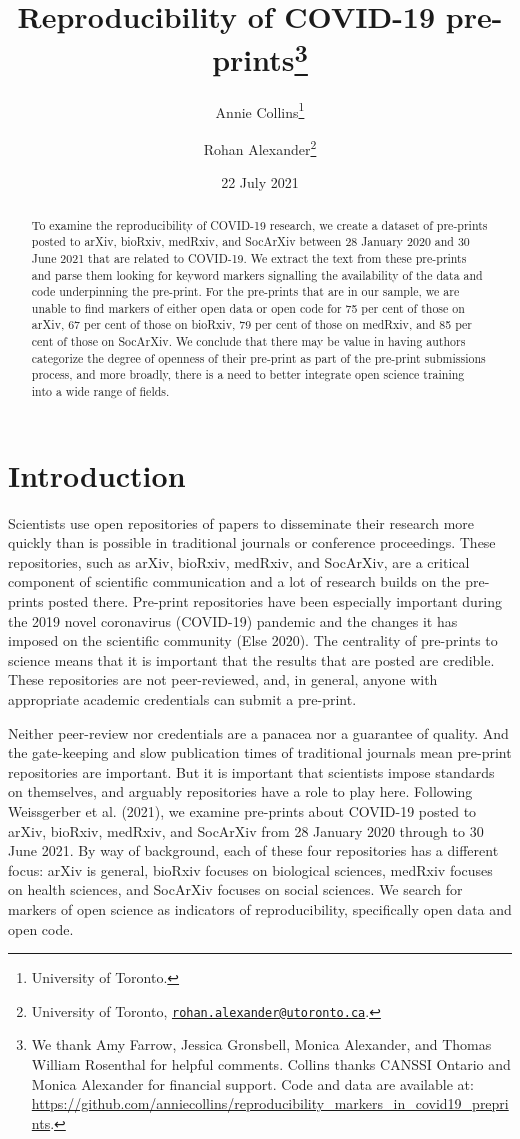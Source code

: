 \documentclass[
]{article}
\title{Reproducibility of COVID-19 pre-prints\thanks{We thank Amy Farrow, Jessica Gronsbell, Monica Alexander, and Thomas William Rosenthal for helpful comments. Collins thanks CANSSI Ontario and Monica Alexander for financial support. Code and data are available at: \url{https://github.com/anniecollins/reproducibility_markers_in_covid19_preprints}.}}
\author{Annie Collins\footnote{University of Toronto.} \and Rohan Alexander\footnote{University of Toronto, \href{mailto:rohan.alexander@utoronto.ca}{\nolinkurl{rohan.alexander@utoronto.ca}}.}}
\date{22 July 2021}
\begin{document}
\maketitle
\begin{abstract}
To examine the reproducibility of COVID-19 research, we create a dataset of pre-prints posted to arXiv, bioRxiv, medRxiv, and SocArXiv between 28 January 2020 and 30 June 2021 that are related to COVID-19. We extract the text from these pre-prints and parse them looking for keyword markers signalling the availability of the data and code underpinning the pre-print. For the pre-prints that are in our sample, we are unable to find markers of either open data or open code for 75 per cent of those on arXiv, 67 per cent of those on bioRxiv, 79 per cent of those on medRxiv, and 85 per cent of those on SocArXiv. We conclude that there may be value in having authors categorize the degree of openness of their pre-print as part of the pre-print submissions process, and more broadly, there is a need to better integrate open science training into a wide range of fields.
\end{abstract}

\hypertarget{introduction}{%
\section{Introduction}\label{introduction}}

Scientists use open repositories of papers to disseminate their research more quickly than is possible in traditional journals or conference proceedings. These repositories, such as arXiv, bioRxiv, medRxiv, and SocArXiv, are a critical component of scientific communication and a lot of research builds on the pre-prints posted there. Pre-print repositories have been especially important during the 2019 novel coronavirus (COVID-19) pandemic and the changes it has imposed on the scientific community (Else 2020). The centrality of pre-prints to science means that it is important that the results that are posted are credible. These repositories are not peer-reviewed, and, in general, anyone with appropriate academic credentials can submit a pre-print.

Neither peer-review nor credentials are a panacea nor a guarantee of quality. And the gate-keeping and slow publication times of traditional journals mean pre-print repositories are important. But it is important that scientists impose standards on themselves, and arguably repositories have a role to play here. Following Weissgerber et al. (2021), we examine pre-prints about COVID-19 posted to arXiv, bioRxiv, medRxiv, and SocArXiv from 28 January 2020 through to 30 June 2021. By way of background, each of these four repositories has a different focus: arXiv is general, bioRxiv focuses on biological sciences, medRxiv focuses on health sciences, and SocArXiv focuses on social sciences. We search for markers of open science as indicators of reproducibility, specifically open data and open code.
\end{document}
